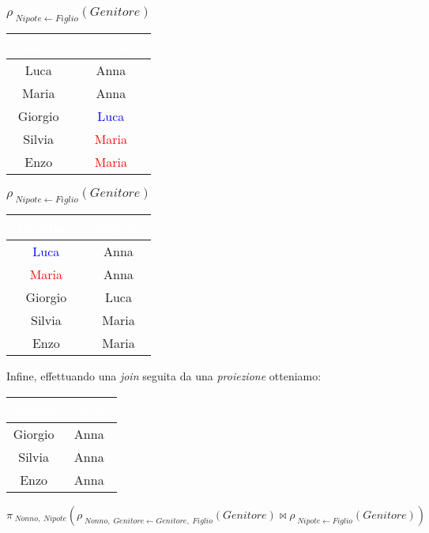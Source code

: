 \begin{table}[H]
    \parbox{.55\linewidth}{
    \centering
    \begin{tabular}{|c|c|}
        \hline
        \rowcolor{purple}
        \textcolor{white}{Nonno} & \textcolor{white}{Genitore} \\
        \hline
        Luca & Anna \\
        \hline
        Maria & Anna \\
        \hline
        Giorgio & \textcolor{blue}{Luca} \\
        \hline
        Silvia & \textcolor{red}{Maria} \\
        \hline
        Enzo & \textcolor{red}{Maria} \\
        \hline
    \end{tabular}
    \caption{$\rho_{\;Nonno,\;Genitore \leftarrow Genitore,\;Figlio}(Genitore)$}
    }
    \hfill
    \parbox{.45\linewidth}{
    \centering
    \begin{tabular}{|c|c|}
        \hline
        \rowcolor{purple}
        \textcolor{white}{Genitore} & \textcolor{white}{Nipote} \\
        \hline
        \textcolor{blue}{Luca} & Anna \\
        \hline
        \textcolor{red}{Maria} & Anna \\
        \hline
        Giorgio & Luca \\
        \hline
        Silvia & Maria \\
        \hline
        Enzo & Maria \\
        \hline
    \end{tabular}
    \caption{$\rho_{\;Nipote \leftarrow Figlio}(Genitore)$}
    }
\end{table}
Infine, effettuando una \emph{join} seguita da una \emph{proiezione} otteniamo:
\begin{center}
    \begin{tabular}{|c|c|}
        \hline
        \rowcolor{purple}
        \textcolor{white}{Nonno} & \textcolor{white}{Nipote} \\
        \hline
        Giorgio & Anna \\
        \hline
        Silvia & Anna \\
        \hline
        Enzo & Anna \\
        \hline
    \end{tabular}
\end{center}

\begin{center}
    $\pi_{\;Nonno,\;Nipote}(\rho_{\;Nonno,\;Genitore \leftarrow Genitore,\;Figlio}(Genitore) \bowtie \rho_{\;Nipote \leftarrow Figlio}(Genitore))$
\end{center}